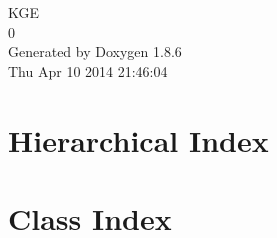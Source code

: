 \documentclass[twoside]{book}
\newcommand{\clearemptydoublepage}{%
  \newpage{\pagestyle{empty}\cleardoublepage}%
}
\begin{document}
\hypersetup{pageanchor=false}
\begin{titlepage}
\vspace*{7cm}
\begin{center}%
{\Large K\-G\-E \\[1ex]\large 0 }\\
\vspace*{1cm}
{\large Generated by Doxygen 1.8.6}\\
\vspace*{0.5cm}
{\small Thu Apr 10 2014 21:46:04}\\
\end{center}
\end{titlepage}
\clearemptydoublepage
\tableofcontents
\clearemptydoublepage
{}
\hypersetup{pageanchor=true}

\chapter{Hierarchical Index}

\chapter{Class Index}

\end{document}
